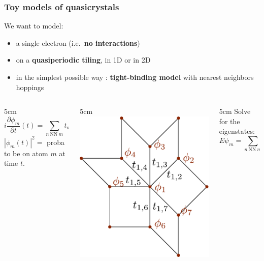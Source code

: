 \documentclass[xcolor=x11names,compress,professionalfonts, aspectratio=169]{beamer}
\renewcommand{\(}{\begin{columns}}
\renewcommand{\)}{\end{columns}}
\newcommand{\<}[1]{\begin{column}{#1}}
\renewcommand{\>}{\end{column}}
\begin{document}
\begin{frame}
\frametitle{Toy models of quasicrystals}
We want to model:
\begin{itemize}
	\item a single electron (i.e.~\textbf{no interactions})
	\item on a \textbf{quasiperiodic tiling}, in 1D or in 2D
	\item in the simplest possible way : \textbf{tight-binding model} with nearest neighbors hoppings
\end{itemize}

\begin{columns}
\<{5cm}
\[
	i \frac{\partial \phi_m}{\partial t}(t) = \sum_{n ~\text{NN}~m} t_{m,n} \phi_n(t)
\]
$|\phi_m(t)|^2= $ proba to be on atom $m$ at time $t$.
\>

\<{5cm}
\centering
\includegraphics[scale=0.45]{img/ham_example.pdf}
\>

\<{5cm}
Solve for the eigenstates:
\[
	E \psi_m = \sum_{n ~\text{NN}~m} t_{m,n} \psi_n
\]
\>
\end{columns}
\end{frame}
\end{document}
